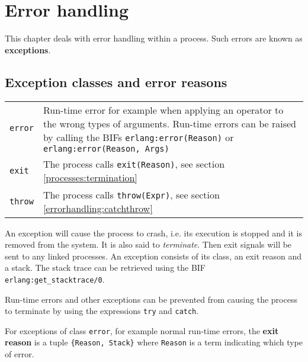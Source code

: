 \chapter{Error handling}
\label{errorhandling}

This chapter deals with error handling within a process. Such errors
are known as \textbf{exceptions}.


\section{Exception classes and error reasons}

\begin{center}
\begin{tabular}{|>{\raggedright}p{49pt}|>{\raggedright}p{277pt}|}
\hline
\multicolumn{2}{|p{326pt}|}{Exception classes}\tabularnewline
\hline
\texttt{error} & Run-time error for example when applying an operator to the wrong types of arguments. Run-time errors can be raised by calling
	the BIFs \texttt{erlang:error(Reason)} or \texttt{erlang:error(Reason, Args)} \tabularnewline
\hline
\texttt{exit}  & The process calls \texttt{exit(Reason)}, see section \ref{processes:termination}\tabularnewline
\hline
\texttt{throw}  & The process calls \texttt{throw(Expr)}, see section \ref{errorhandling:catchthrow}\tabularnewline
\hline
\end{tabular}
\end{center}

An exception will cause the process to crash, i.e. its execution is
stopped and it is removed from the system. It is also said to
\textit{terminate}. Then exit signals will be sent to any linked
processes.\textit{ }An exception consists of its class, an exit reason
and a stack. The stack trace can be retrieved using the BIF
\texttt{erlang:get\_stacktrace/0}.

Run-time errors and other exceptions can be prevented from causing the
process to terminate by using the expressions \texttt{try} and \texttt{catch}.

For exceptions of class \texttt{error}, for example normal run-time errors, the
\textbf{exit reason} is a tuple \texttt{\{Reason, Stack\}} where
\texttt{Reason} is a term indicating which type of error.

